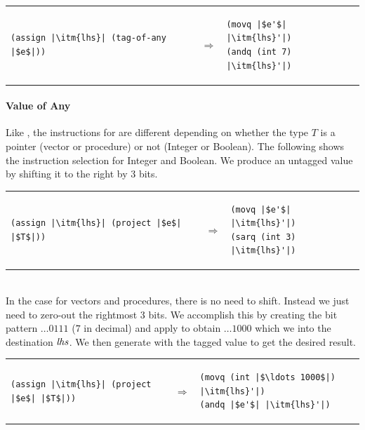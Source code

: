 \documentclass[11pt]{book}
\begin{document}
\begin{tabular}{lll}
\begin{minipage}{0.4\textwidth}
\begin{lstlisting}
(assign |\itm{lhs}| (tag-of-any |$e$|))
\end{lstlisting}
\end{minipage}
&
$\Rightarrow$
&
\begin{minipage}{0.5\textwidth}
\begin{lstlisting}
(movq |$e'$| |\itm{lhs}'|)
(andq (int 7) |\itm{lhs}'|)
\end{lstlisting}
\end{minipage}
\end{tabular}  

\paragraph{Value of Any}

Like , the instructions for  are
different depending on whether the type $T$ is a pointer (vector or
procedure) or not (Integer or Boolean). The following shows the
instruction selection for Integer and Boolean.  We produce an untagged
value by shifting it to the right by 3 bits.
%
\\
\begin{tabular}{lll}
\begin{minipage}{0.4\textwidth}
\begin{lstlisting}
(assign |\itm{lhs}| (project |$e$| |$T$|))
\end{lstlisting}
\end{minipage}
&
$\Rightarrow$
&
\begin{minipage}{0.5\textwidth}
\begin{lstlisting}
(movq |$e'$| |\itm{lhs}'|)
(sarq (int 3) |\itm{lhs}'|)
\end{lstlisting}
\end{minipage}
\end{tabular}  \\
%
In the case for vectors and procedures, there is no need to
shift. Instead we just need to zero-out the rightmost 3 bits. We
accomplish this by creating the bit pattern $\ldots 0111$ ($7$ in
decimal) and apply  to obtain $\ldots 1000$ which we
 into the destination $\mathit{lhs}$.  We then generate
 with the tagged value to get the desired result. \\
%
\begin{tabular}{lll}
\begin{minipage}{0.4\textwidth}
\begin{lstlisting}
(assign |\itm{lhs}| (project |$e$| |$T$|))
\end{lstlisting}
\end{minipage}
&
$\Rightarrow$
&
\begin{minipage}{0.5\textwidth}
\begin{lstlisting}
(movq (int |$\ldots 1000$|) |\itm{lhs}'|)
(andq |$e'$| |\itm{lhs}'|)
\end{lstlisting}
\end{minipage}
\end{tabular}  
\end{document}
